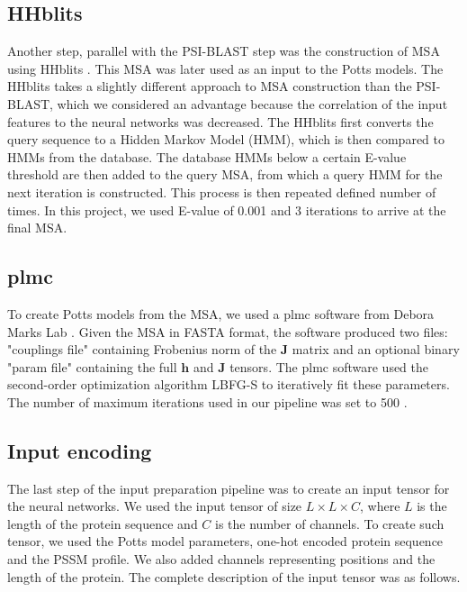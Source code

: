 \subsection{HHblits}
Another step, parallel with the PSI-BLAST step was the construction of MSA using HHblits \cite{remmert2012hhblits}.
This MSA was later used as an input to the Potts models.
The HHblits takes a slightly different approach to MSA construction than the PSI-BLAST, which we considered an advantage because the correlation of the input features to the neural networks was decreased.
The HHblits first converts the query sequence to a Hidden Markov Model (HMM), which is then compared to HMMs from the database.
The database HMMs below a certain E-value threshold are then added to the query MSA, from which a query HMM for the next iteration is constructed.
This process is then repeated defined number of times.
In this project, we used E-value of 0.001 and 3 iterations to arrive at the final MSA.

\subsection{plmc}
To create Potts models from the MSA, we used a plmc software from Debora Marks Lab \cite{plmc}.
Given the MSA in FASTA format, the software produced two files: "couplings file" containing Frobenius norm of the $\bm{J}$ matrix and an optional binary "param file" containing the full $\bm{h}$ and $\bm{J}$ tensors. 
The plmc software used the second-order optimization algorithm LBFG-S to iteratively fit these parameters.
The number of maximum iterations used in our pipeline was set to 500 \cite{plmc}.

\subsection{Input encoding}
The last step of the input preparation pipeline was to create an input tensor for the neural networks.
We used the input tensor of size $L \times L \times C$, where $L$ is the length of the protein sequence and $C$ is the number of channels.
To create such tensor, we used the Potts model parameters, one-hot encoded protein sequence and the PSSM profile.
We also added channels representing positions and the length of the protein.
The complete description of the input tensor was as follows.

